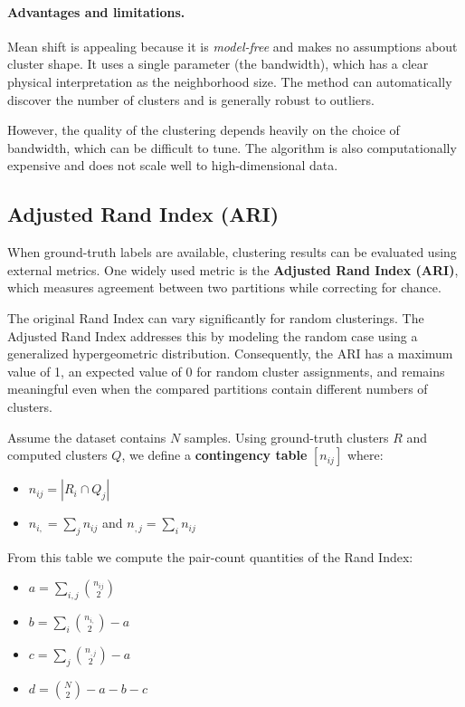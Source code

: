 \documentclass{article}
\begin{document}
\paragraph{Advantages and limitations.}
Mean shift is appealing because it is \emph{model-free} and makes no assumptions about 
cluster shape. It uses a single parameter (the bandwidth), which has a clear physical 
interpretation as the neighborhood size. The method can automatically discover the 
number of clusters and is generally robust to outliers. 

However, the quality of the clustering depends heavily on the choice of bandwidth, 
which can be difficult to tune. The algorithm is also computationally expensive and 
does not scale well to high-dimensional data.

\subsection{Adjusted Rand Index (ARI)}

When ground-truth labels are available, clustering results can be evaluated using 
external metrics. One widely used metric is the \textbf{Adjusted Rand Index (ARI)}, 
which measures agreement between two partitions while correcting for chance.

The original Rand Index can vary significantly for random clusterings. 
The Adjusted Rand Index addresses this by modeling the random case using a 
generalized hypergeometric distribution. Consequently, the ARI has a maximum value 
of 1, an expected value of 0 for random cluster assignments, and remains meaningful 
even when the compared partitions contain different numbers of clusters.

Assume the dataset contains $N$ samples. Using ground-truth clusters $R$ and computed 
clusters $Q$, we define a \textbf{contingency table} $[n_{ij}]$ where:

\begin{itemize}
    \item $n_{ij}=|R_i \cap Q_j|$
    \item $n_{i,}=\sum_j n_{ij}$ and $n_{,j}=\sum_i n_{ij}$
\end{itemize}

From this table we compute the pair-count quantities of the Rand Index:
\begin{itemize}
    \item $a=\displaystyle\sum_{i,j}\binom{n_{ij}}{2}$
    \item $b=\displaystyle\sum_i\binom{n_{i,}}{2}-a$
    \item $c=\displaystyle\sum_j\binom{n_{,j}}{2}-a$
    \item $d=\displaystyle\binom{N}{2}-a-b-c$
\end{itemize}
\end{document}
